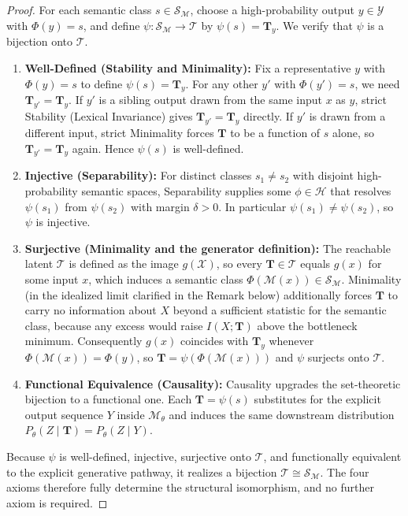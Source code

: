 \begin{proof}
For each semantic class $s \in \mathcal{S}_{\mathcal{M}}$, choose a high-probability output $y \in \mathcal{Y}$ with $\Phi(y) = s$, and define $\psi : \mathcal{S}_{\mathcal{M}} \to \mathcal{T}$ by $\psi(s) = \mathbf{T}_y$. We verify that $\psi$ is a bijection onto $\mathcal{T}$.
\begin{enumerate}
    \item \textbf{Well-Defined (Stability and Minimality):} Fix a representative $y$ with $\Phi(y) = s$ to define $\psi(s) = \mathbf{T}_y$. For any other $y'$ with $\Phi(y') = s$, we need $\mathbf{T}_{y'} = \mathbf{T}_y$. If $y'$ is a sibling output drawn from the same input $x$ as $y$, strict Stability (Lexical Invariance) gives $\mathbf{T}_{y'} = \mathbf{T}_y$ directly. If $y'$ is drawn from a different input, strict Minimality forces $\mathbf{T}$ to be a function of $s$ alone, so $\mathbf{T}_{y'} = \mathbf{T}_y$ again. Hence $\psi(s)$ is well-defined.
    \item \textbf{Injective (Separability):} For distinct classes $s_1 \neq s_2$ with disjoint high-probability semantic spaces, Separability supplies some $\phi \in \mathcal{H}$ that resolves $\psi(s_1)$ from $\psi(s_2)$ with margin $\delta > 0$. In particular $\psi(s_1) \neq \psi(s_2)$, so $\psi$ is injective.
    \item \textbf{Surjective (Minimality and the generator definition):} The reachable latent $\mathcal{T}$ is defined as the image $g(\mathcal{X})$, so every $\mathbf{T} \in \mathcal{T}$ equals $g(x)$ for some input $x$, which induces a semantic class $\Phi(\mathcal{M}(x)) \in \mathcal{S}_{\mathcal{M}}$. Minimality (in the idealized limit clarified in the Remark below) additionally forces $\mathbf{T}$ to carry no information about $X$ beyond a sufficient statistic for the semantic class, because any excess would raise $I(X; \mathbf{T})$ above the bottleneck minimum. Consequently $g(x)$ coincides with $\mathbf{T}_y$ whenever $\Phi(\mathcal{M}(x)) = \Phi(y)$, so $\mathbf{T} = \psi(\Phi(\mathcal{M}(x)))$ and $\psi$ surjects onto $\mathcal{T}$.
    \item \textbf{Functional Equivalence (Causality):} Causality upgrades the set-theoretic bijection to a functional one. Each $\mathbf{T} = \psi(s)$ substitutes for the explicit output sequence $Y$ inside $\mathcal{M}_\theta$ and induces the same downstream distribution $P_{\theta}(Z \mid \mathbf{T}) = P_{\theta}(Z \mid Y)$.
\end{enumerate}
Because $\psi$ is well-defined, injective, surjective onto $\mathcal{T}$, and functionally equivalent to the explicit generative pathway, it realizes a bijection $\mathcal{T} \cong \mathcal{S}_{\mathcal{M}}$. The four axioms therefore fully determine the structural isomorphism, and no further axiom is required.
\end{proof}

